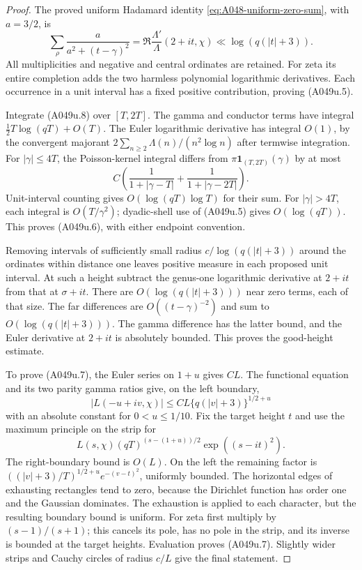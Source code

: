 \begin{proof}
The proved uniform Hadamard identity
\eqref{eq:A048-uniform-zero-sum}, with $a=3/2$, is
\[
 \sum_\rho\frac{a}{a^2+(t-\gamma)^2}
        =\Re\frac{\Lambda'}{\Lambda}(2+it,\chi)
        \ll\log(q(|t|+3)).
\tag{A049u.8}
\]
All multiplicities and negative and central ordinates are retained.
For zeta its entire completion adds the two harmless polynomial
logarithmic derivatives. Each occurrence in a unit interval
has a fixed positive contribution, proving (A049u.5).

Integrate (A049u.8) over $[T,2T]$. The gamma and conductor
terms have integral $\frac12T\log(qT)+O(T)$. The Euler
logarithmic derivative has integral $O(1)$, by the convergent
majorant $2\sum_{n\ge2}\Lambda(n)/(n^2\log n)$ after termwise
integration. For $|\gamma|\le4T$, the Poisson-kernel integral
differs from $\pi\mathbf1_{(T,2T)}(\gamma)$ by at most
\[
 C\left(\frac1{1+|\gamma-T|}+\frac1{1+|\gamma-2T|}\right).
\]
Unit-interval counting gives $O(\log(qT)\log T)$ for their
sum. For $|\gamma|>4T$, each integral is $O(T/\gamma^2)$;
dyadic-shell use of (A049u.5) gives $O(\log(qT))$.
This proves (A049u.6), with either endpoint convention.

Removing intervals of sufficiently small radius
$c/\log(q(|t|+3))$ around the ordinates within distance one
leaves positive measure in each proposed unit interval.
At such a height subtract the genus-one logarithmic derivative
at $2+it$ from that at $\sigma+it$. There are
$O(\log(q(|t|+3)))$ near zero terms, each of that size.
The far differences are $O((t-\gamma)^{-2})$ and sum to
$O(\log(q(|t|+3)))$. The gamma difference has the latter
bound, and the Euler derivative at $2+it$ is absolutely
bounded. This proves the good-height estimate.

To prove (A049u.7), the Euler series on $1+u$ gives $CL$.
The functional equation and its two parity gamma ratios give,
on the left boundary,
\[
 |L(-u+iv,\chi)|\le CL\{q(|v|+3)\}^{1/2+u}
\]
with an absolute constant for $0<u\le1/10$. Fix the target
height $t$ and use the maximum principle on the strip for
\[
 L(s,\chi)(qT)^{(s-(1+u))/2}\exp((s-it)^2).
\]
The right-boundary bound is $O(L)$. On the left the
remaining factor is
$((|v|+3)/T)^{1/2+u}e^{-(v-t)^2}$, uniformly bounded.
The horizontal edges of exhausting rectangles tend to zero,
because the Dirichlet function has order one and the Gaussian
dominates. The exhaustion is applied to each character,
but the resulting boundary bound is uniform. For zeta
first multiply by $(s-1)/(s+1)$; this cancels its pole,
has no pole in the strip, and its inverse is bounded at
the target heights. Evaluation proves (A049u.7).
Slightly wider strips and Cauchy circles of radius $c/L$
give the final statement.
\end{proof}

